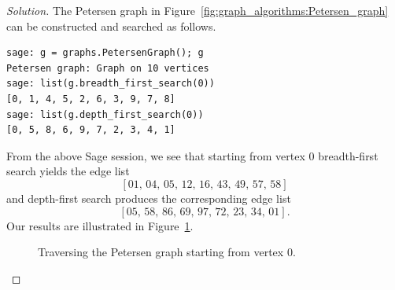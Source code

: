 \begin{proof}[Solution]
The Petersen graph in
Figure~\ref{fig:graph_algorithms:Petersen_graph}
can be constructed and searched as follows.
\begin{lstlisting}
sage: g = graphs.PetersenGraph(); g
Petersen graph: Graph on 10 vertices
sage: list(g.breadth_first_search(0))
[0, 1, 4, 5, 2, 6, 3, 9, 7, 8]
sage: list(g.depth_first_search(0))
[0, 5, 8, 6, 9, 7, 2, 3, 4, 1]
\end{lstlisting}
From the above Sage session, we see that starting from vertex $0$
breadth-first search yields the edge list
\[
[01,\, 04,\, 05,\, 12,\, 16,\, 43,\, 49,\, 57,\, 58]
\]
and depth-first search produces the
corresponding edge list
\[
[05,\, 58,\, 86,\, 69,\, 97,\, 72,\, 23,\, 34,\, 01].
\]
Our results are illustrated in
Figure~\ref{fig:graph_algorithms:search_Petersen_graph}.
\begin{figure}[!htbp]
\centering
{}
\qquad
{}
\caption{Traversing the Petersen graph starting from vertex $0$.}
\label{fig:graph_algorithms:search_Petersen_graph}
\end{figure}
\end{proof}


